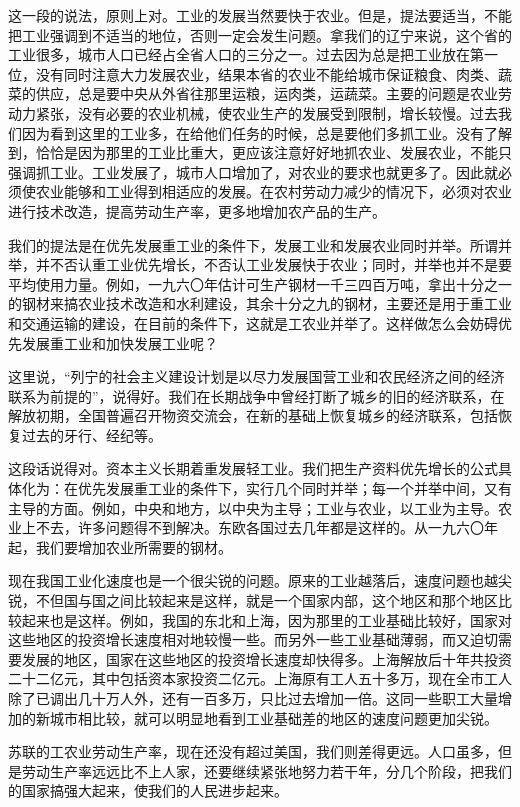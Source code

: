 这一段的说法，原则上对。工业的发展当然要快于农业。但是，提法要适当，不能把工业强调到不适当的地位，否则一定会发生问题。拿我们的辽宁来说，这个省的工业很多，城市人口已经占全省人口的三分之一。过去因为总是把工业放在第一位，没有同时注意大力发展农业，结果本省的农业不能给城市保证粮食、肉类、蔬菜的供应，总是要中央从外省往那里运粮，运肉类，运蔬菜。主要的问题是农业劳动力紧张，没有必要的农业机械，使农业生产的发展受到限制，增长较慢。过去我们因为看到这里的工业多，在给他们任务的时候，总是要他们多抓工业。没有了解到，恰恰是因为那里的工业比重大，更应该注意好好地抓农业、发展农业，不能只强调抓工业。工业发展了，城市人口增加了，对农业的要求也就更多了。因此就必须使农业能够和工业得到相适应的发展。在农村劳动力减少的情况下，必须对农业进行技术改造，提高劳动生产率，更多地增加农产品的生产。

我们的提法是在优先发展重工业的条件下，发展工业和发展农业同时并举。所谓并举，并不否认重工业优先增长，不否认工业发展快于农业；同时，并举也并不是要平均使用力量。例如，一九六〇年估计可生产钢材一千三四百万吨，拿出十分之一的钢材来搞农业技术改造和水利建设，其余十分之九的钢材，主要还是用于重工业和交通运输的建设，在目前的条件下，这就是工农业并举了。这样做怎么会妨碍优先发展重工业和加快发展工业呢？

这里说，“列宁的社会主义建设计划是以尽力发展国营工业和农民经济之间的经济联系为前提的”，说得好。我们在长期战争中曾经打断了城乡的旧的经济联系，在解放初期，全国普遍召开物资交流会，在新的基础上恢复城乡的经济联系，包括恢复过去的牙行、经纪等。

这段话说得对。资本主义长期着重发展轻工业。我们把生产资料优先增长的公式具体化为：在优先发展重工业的条件下，实行几个同时并举；每一个并举中间，又有主导的方面。例如，中央和地方，以中央为主导；工业与农业，以工业为主导。农业上不去，许多问题得不到解决。东欧各国过去几年都是这样的。从一九六〇年起，我们要增加农业所需要的钢材。

现在我国工业化速度也是一个很尖锐的问题。原来的工业越落后，速度问题也越尖锐，不但国与国之间比较起来是这样，就是一个国家内部，这个地区和那个地区比较起来也是这样。例如，我国的东北和上海，因为那里的工业基础比较好，国家对这些地区的投资增长速度相对地较慢一些。而另外一些工业基础薄弱，而又迫切需要发展的地区，国家在这些地区的投资增长速度却快得多。上海解放后十年共投资二十二亿元，其中包括资本家投资二亿元。上海原有工人五十多万，现在全市工人除了已调出几十万人外，还有一百多万，只比过去增加一倍。这同一些职工大量增加的新城市相比较，就可以明显地看到工业基础差的地区的速度问题更加尖锐。

苏联的工农业劳动生产率，现在还没有超过美国，我们则差得更远。人口虽多，但是劳动生产率远远比不上人家，还要继续紧张地努力若干年，分几个阶段，把我们的国家搞强大起来，使我们的人民进步起来。


